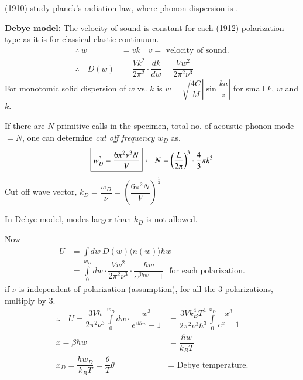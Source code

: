 (1910) study planck's radiation law, where phonon dispersion is .

\noindent
{\bf Debye model:} The velocity of sound is constant for each (1912) polarization type as it is for classical elastic continuum. 
\begin{align*}
\therefore \ w&= vk\quad v= \text{ velocity of sound.}\\
\therefore\quad D(w) &= \dfrac{Vk^{2}}{2\pi^{2}}\cdot \dfrac{dk}{dw}=\dfrac{Vw^{2}}{2\pi^{2}\nu^{3}}
\end{align*}
For monotomic solid dispersion of $w$ vs. $k$ is $w=\sqrt{\dfrac{4C}{M}}\left|\sin \dfrac{ka}{z}\right|$ for small $k$, $w$ and $k$.

If there are $N$ primitive calls in the specimen, total no. of acoustic phonon mode $=N$, one can determine {\em cut off frequency} $w_{D}$ as.
$$
\fbox{$w^{3}_{D}=\dfrac{6\pi^{2}\nu^{3}N}{V}$} \leftarrow N=\left(\dfrac{L}{2\pi}\right)^{3}\cdot \dfrac{4}{3}\pi k^{3}
$$
Cut off wave vector, $k_{D}=\dfrac{w_{D}}{\nu}=\left(\dfrac{6\pi^{2}N}{V}\right)^{\frac{1}{3}}$

In Debye model, modes larger than $k_{D}$ is not allowed.

Now
\begin{align*}
U &= \int dw \ D(w)\langle n(w)\rangle \hbar w\\
&= \int\limits^{w_{D}}_{0}dw\cdot \dfrac{Vw^{2}}{2\pi^{2}\nu^{3}}\cdot \dfrac{\hbar w}{e^{\beta\hbar w}-1}\text{~ for each polarization.}
\end{align*}
if $\nu$ is independent of polarization (assumption), for all the 3 polarizations, multiply by 3.
\begin{align*}
\therefore\quad U=\dfrac{3V\hbar}{2\pi^{2}\nu^{3}}\int\limits^{w_{D}}_{0}dw\cdot \dfrac{w^{3}}{e^{\beta \hbar w}-1} &= \dfrac{3Vk^{4}_{B}T^{4}}{2\pi^{2}\nu^{3}\hbar^{3}}\int\limits_{0}^{x_{D}}\dfrac{x^{3}}{e^{x}-1}\\
x = \beta\hbar w &= \dfrac{\hbar w}{k_{B}T}\\
x_{D}=\dfrac{\hbar w_{D}}{k_{B}T}=\dfrac{\theta}{T} \theta &= \text{ Debye temperature.}
\end{align*}

